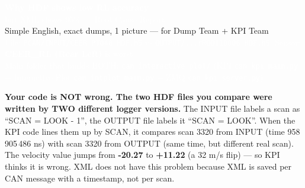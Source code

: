 \documentclass[11pt,a4paper]{article}
\begin{document}
\begin{tcolorbox}[colback=navy,colframe=navy,arc=3mm,boxsep=5mm,left=4mm,right=4mm]
  \textcolor{white}{\LARGE\textbf{Why HDF shows low RL accuracy}}\\[1mm]
  \textcolor{white}{\Large but XML shows 95\% — Root Cause Report}\\[3mm]
  \textcolor{accentLight}{\small Simple English, exact dumps, 1 picture — for Dump Team + KPI Team}\\
  \textcolor{white}{\footnotesize File: \texttt{PCAN/INPUT/CEER\_PT048\_HDF.h5} vs \texttt{OUTPUT/...rR00110006\_HDF.h5} \quad|\quad Sensor: \textbf{CEER\_RL (Rear Left)} is worst}\\
  \textcolor{white}{\footnotesize Main folder that builds BOTH: \texttt{can\_interactive\_plot/} \;(KPI \texttt{can\_kpi\_main.py} + Interactive Plot \texttt{can\_intplot\_main.py} + ZMQ \texttt{can\_kpi\_server.py})}
\end{tcolorbox}
\vspace{-2mm}

\begin{tcolorbox}[colback=accentLight,colframe=accent,arc=2mm,boxsep=3mm,title=\textbf{One-sentence answer (13-year-old version)}]
\textbf{Your code is NOT wrong. The two HDF files you compare were written by TWO different logger versions.} The INPUT file labels a scan as “SCAN = LOOK - 1”, the OUTPUT file labels it “SCAN = LOOK”. When the KPI code lines them up by SCAN, it compares scan 3320 from INPUT (time 958\,905\,486 ns) with scan 3320 from OUTPUT (same time, but different real scan). The velocity value jumps from \textbf{-20.27} to \textbf{+11.22} (a 32 m/s flip) — so KPI thinks it is wrong. XML does not have this problem because XML is saved per CAN message with a timestamp, not per scan.
\end{tcolorbox}
\end{document}
